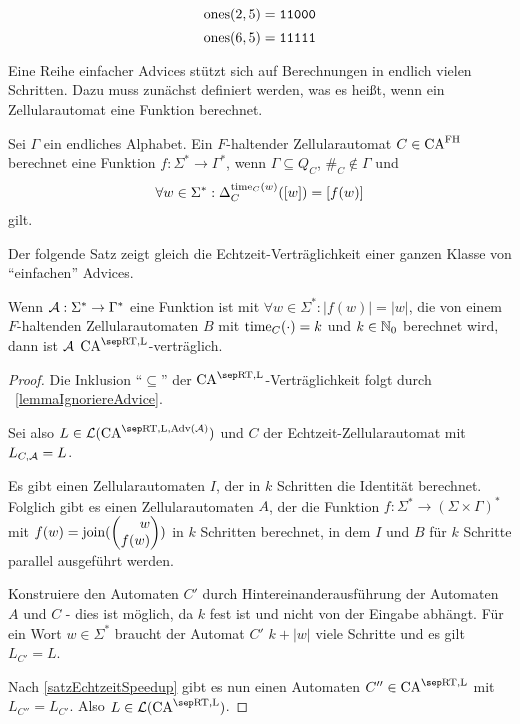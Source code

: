 \begin{exmp}
    \[
        \mathrm{ones}(2, 5) = \texttt{11000}
    \]
    \[
        \mathrm{ones}(6, 5) = \texttt{11111}
    \]        
\end{exmp}

Eine Reihe einfacher Advices stützt sich auf Berechnungen in endlich vielen Schritten.
Dazu muss zunächst definiert werden, was es heißt, wenn ein Zellularautomat eine Funktion berechnet.
\begin{definition}
    Sei $\Gamma$ ein endliches Alphabet.
    Ein $F$-haltender Zellularautomat $C \in \textrm{CA}^{\textrm{FH}}$ berechnet eine Funktion $f: \Sigma^* \to \Gamma^*$, wenn
    $\Gamma \subseteq Q_C$, $\#_C \not\in \Gamma$ und 
    \[
        \forall w \in \Sigma^*: \Delta^{\operatorname{time}_C(w)}_{C}([w]) = [f(w)]
    \]
    gilt.
\end{definition}

Der folgende Satz zeigt gleich die Echtzeit-Verträglichkeit einer ganzen Klasse von \enquote{einfachen} Advices.
\begin{satz}
    \label{lemmaEinfachesOrakel}
    Wenn $\mathcal{A}: \Sigma^* \to \Gamma^*$ eine Funktion ist mit $\forall w \in \Sigma^*: |f(w)| = |w|$,
    die von einem $F$-haltenden Zellularautomaten $B$ mit
    $\operatorname{time}_C(\cdot) = k$ und $k \in \mathbb{N}_0$ berechnet wird,
    dann ist $\mathcal{A}$ $\CAM{\CART, \CALeft}$-verträglich.
\end{satz}
\begin{proof}
    Die Inklusion \enquote{$\subseteq$} der $\CAM{\CART, \CALeft}$-Verträglichkeit folgt durch ~\cref{lemmaIgnoriereAdvice}.
    
    Sei also $L \in \CAL{\CART, \CALeft, \orakel({\advA})}$ und $C$
    der Echtzeit-Zellularautomat mit $L_{C, \mathcal{A}} = L$.
    
    Es gibt einen Zellularautomaten $I$, der in $k$ Schritten die Identität berechnet. Folglich gibt es einen Zellularautomaten $A$, der die Funktion $f: \Sigma^* \to (\Sigma \times \Gamma)^*$ mit
    $f(w) = \joinw(\Spvek{w; f(w)})$ in $k$ Schritten berechnet, in dem $I$ und $B$ für $k$ Schritte parallel ausgeführt werden.
    
    Konstruiere den Automaten $C'$ durch Hintereinanderausführung der Automaten $A$ und $C$ - dies ist möglich, da $k$ fest ist und nicht von der Eingabe abhängt.
    Für ein Wort $w \in \Sigma^*$ braucht der Automat $C'$ $k + |w|$ viele Schritte und es gilt $L_{C'} = L$.
    
    Nach \cref{satzEchtzeitSpeedup} gibt es nun einen Automaten $C'' \in \CAM{\CART, \CALeft}$
    mit $L_{C''} = L_{C'}$.
    Also $L \in \CAL{\CART, \CALeft}$.
\end{proof}

